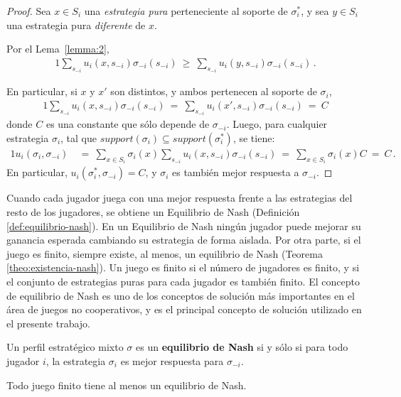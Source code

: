 \begin{proof}
Sea $x \in S_i$ una \emph{estrategia pura} perteneciente al soporte de $\sigma^*_i$, y sea $y \in S_i$ una estrategia pura \emph{diferente} de $x$. 

Por el Lema~\ref{lemma:2},
\begin{alignat}{1}
  \sum_{s_{-i}} u_i(x,s_{-i}) \sigma_{-i}(s_{-i})\ \geq\  \sum_{s_{-i}} u_i(y,s_{-i}) \sigma_{-i}(s_{-i}) \,.
\end{alignat}

En particular, si $x$ y $x'$ son distintos, y ambos pertenecen al soporte de $\sigma_i$,
\begin{alignat}{1}
\sum_{s_{-i}} u_i(x,s_{-i}) \sigma_{-i}(s_{-i})\ =\ \sum_{s_{-i}} u_i(x',s_{-i}) \sigma_{-i}(s_{-i})\ =\ C
\end{alignat}
donde $C$ es una constante que s\'olo depende de $\sigma_{-i}$.
Luego, para cualquier estrategia $\sigma_i$, tal que $support(\sigma_i) \subseteq support(\sigma^*_i)$, se tiene:
\begin{alignat}{1}
u_i(\sigma_i, \sigma_{-i})\ &=\ \sum_{x \in S_i} \sigma_i(x) \sum_{s_{-i}} u_i(x,s_{-i}) \sigma_{-i}(s_{-i})\ =\ \sum_{x \in S_i} \sigma_i(x) C\ =\ C \,.
\end{alignat}
En particular, $u_i(\sigma^*_i,\sigma_{-i})=C$, y $\sigma_i$ es también mejor respuesta a $\sigma_{-i}$.
\end{proof}

Cuando cada jugador juega con una mejor respuesta frente a las estrategias del resto de los jugadores, se obtiene un Equilibrio de Nash (Definición \ref{def:equilibrio-nash}). En un Equilibrio de Nash ningún jugador puede mejorar su ganancia esperada cambiando su estrategia de forma aislada. Por otra parte, si el juego es finito, siempre existe, al menos, un equilibrio de Nash (Teorema \ref{theo:existencia-nash}). Un juego es finito si el número de jugadores es finito, y si el conjunto de estrategias puras para cada jugador es también finito. El concepto de equilibrio de Nash es uno de los conceptos de solución más importantes en el área de juegos no cooperativos, y es el principal concepto de solución utilizado en el presente trabajo.

\begin{definition}
\label{def:equilibrio-nash} Un perfil estratégico mixto $\sigma$ es un \textbf{equilibrio de Nash} si y s\'olo si para todo jugador $i$, la estrategia $\sigma_i$ es mejor respuesta para $\sigma_{-i}$.
\end{definition}

\begin{theorem}
\label{theo:existencia-nash}
Todo juego finito tiene al menos un equilibrio de Nash.
\end{theorem}
